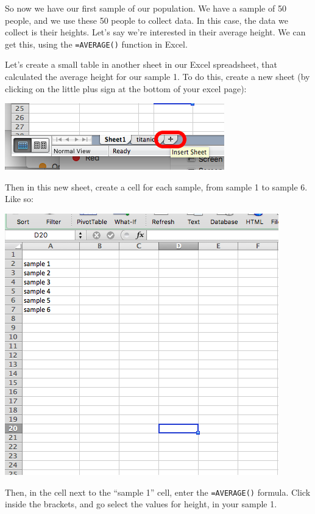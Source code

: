 \documentclass[
]{book}
\begin{document}
So now we have our first sample of our population. We have a sample of 50 people, and we use these 50 people to collect data. In this case, the data we collect is their heights. Let's say we're interested in their average height. We can get this, using the \texttt{=AVERAGE()} function in Excel.

Let's create a small table in another sheet in our Excel spreadsheet, that calculated the average height for our sample 1. To do this, create a new sheet (by clicking on the little plus sign at the bottom of your excel page):

\includegraphics{imgs/new_sheet_2.png}

Then in this new sheet, create a cell for each sample, from sample 1 to sample 6. Like so:

\includegraphics{imgs/set_for_avgs.png}

Then, in the cell next to the ``sample 1'' cell, enter the \texttt{=AVERAGE()} formula. Click inside the brackets, and go select the values for height, in your sample 1.
\end{document}
